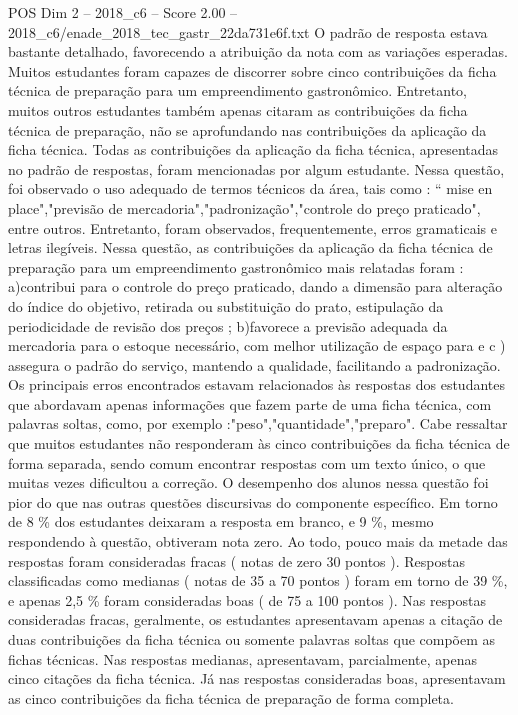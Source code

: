 \begin{textsample}{POS Dim 2 – 2018\_c6 – Score 2.00 – 2018\_c6/enade\_2018\_tec\_gastr\_22da731e6f.txt}
O padrão de resposta estava bastante detalhado, favorecendo a atribuição da nota com as variações esperadas.
Muitos estudantes foram capazes de discorrer sobre cinco contribuições da ficha técnica de preparação para um empreendimento gastronômico.
Entretanto, muitos outros estudantes também apenas citaram as contribuições da ficha técnica de preparação, não se aprofundando nas contribuições da aplicação da ficha técnica.
Todas as contribuições da aplicação da ficha técnica, apresentadas no padrão de respostas, foram mencionadas por algum estudante.
Nessa questão, foi observado o uso adequado de termos técnicos da área, tais como : “ mise en place","previsão de mercadoria","padronização","controle do preço praticado", entre outros.
Entretanto, foram observados, frequentemente, erros gramaticais e letras ilegíveis.
Nessa questão, as contribuições da aplicação da ficha técnica de preparação para um empreendimento gastronômico mais relatadas foram : a)contribui para o controle do preço praticado, dando a dimensão para alteração do índice do objetivo, retirada ou substituição do prato, estipulação da periodicidade de revisão dos preços ; b)favorece a previsão adequada da mercadoria para o estoque necessário, com melhor utilização de espaço para e c ) assegura o padrão do serviço, mantendo a qualidade, facilitando a padronização.
Os principais erros encontrados estavam relacionados às respostas dos estudantes que abordavam apenas informações que fazem parte de uma ficha técnica, com palavras soltas, como, por exemplo :"peso","quantidade","preparo".
Cabe ressaltar que muitos estudantes não responderam às cinco contribuições da ficha técnica de forma separada, sendo comum encontrar respostas com um texto único, o que muitas vezes dificultou a correção.
O desempenho dos alunos nessa questão foi pior do que nas outras questões discursivas do componente específico.
Em torno de 8 \% dos estudantes deixaram a resposta em branco, e 9 \%, mesmo respondendo à questão, obtiveram nota zero.
Ao todo, pouco mais da metade das respostas foram consideradas fracas ( notas de zero 30 pontos ).
Respostas classificadas como medianas ( notas de 35 a 70 pontos ) foram em torno de 39 \%, e apenas 2,5 \% foram consideradas boas ( de 75 a 100 pontos ).
Nas respostas consideradas fracas, geralmente, os estudantes apresentavam apenas a citação de duas contribuições da ficha técnica ou somente palavras soltas que compõem as fichas técnicas.
Nas respostas medianas, apresentavam, parcialmente, apenas cinco citações da ficha técnica.
Já nas respostas consideradas boas, apresentavam as cinco contribuições da ficha técnica de preparação de forma completa.

\end{textsample}
